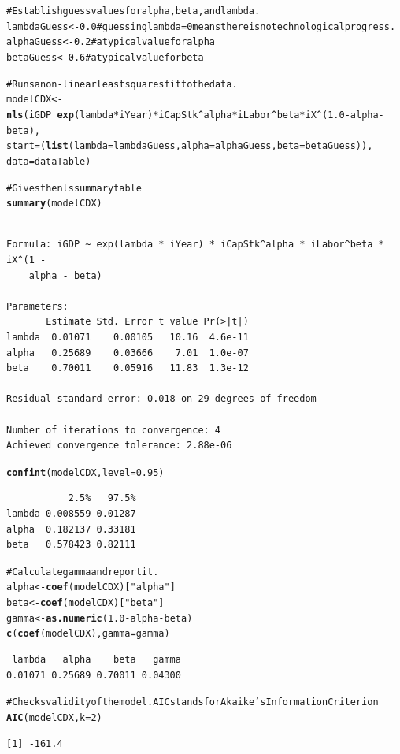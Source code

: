 \documentclass[preprint,authoryear,12pt]{elsarticle}\usepackage{graphicx, color}
\makeatletter
\newcommand{\hlfunctioncall}[1]{\textcolor[rgb]{0.501960784313725,0,0.329411764705882}{\textbf{#1}}}%
\newcommand{\hlstring}[1]{\textcolor[rgb]{0.6,0.6,1}{#1}}%
\newcommand{\hlcomment}[1]{\textcolor[rgb]{0.180392156862745,0.6,0.341176470588235}{#1}}%
\newenvironment{kframe}{%
 \def\at@end@of@kframe{}%
 \ifinner\ifhmode%
  \def\at@end@of@kframe{\end{minipage}}%
  \begin{minipage}{\columnwidth}%
 \fi\fi%
 \def\FrameCommand##1{\hskip\@totalleftmargin \hskip-\fboxsep
 \colorbox{shadecolor}{##1}\hskip-\fboxsep
     \hskip-\linewidth \hskip-\@totalleftmargin \hskip\columnwidth}%
 \MakeFramed {\advance\hsize-\width
   \@totalleftmargin\z@ \linewidth\hsize
   \@setminipage}}%
 {\par\unskip\endMakeFramed%
 \at@end@of@kframe}
\newenvironment{knitrout}{}{} %
\makeatother
\begin{document}
\begin{knitrout}
\color{fgcolor}\begin{kframe}
\begin{alltt}
\hlcomment{# Establish guess values for alpha, beta, and lambda.}
lambdaGuess <- 0.0 \hlcomment{# guessing lambda = 0 means there is no technological progress.}
alphaGuess <- 0.2 \hlcomment{# a typical value for alpha}
betaGuess <- 0.6 \hlcomment{# a typical value for beta}

\hlcomment{# Runs a non-linear least squares fit to the data.}
modelCDX <- \hlfunctioncall{nls}(iGDP ~ \hlfunctioncall{exp}(lambda*iYear) * iCapStk^alpha * iLabor^beta * iX^(1.0 - alpha - beta), 
                start=(\hlfunctioncall{list}(lambda=lambdaGuess,alpha=alphaGuess,beta=betaGuess)),
                data=dataTable)

\hlcomment{# Gives the nls summary table}
\hlfunctioncall{summary}(modelCDX)
\end{alltt}
\begin{verbatim}

Formula: iGDP ~ exp(lambda * iYear) * iCapStk^alpha * iLabor^beta * iX^(1 - 
    alpha - beta)

Parameters:
       Estimate Std. Error t value Pr(>|t|)
lambda  0.01071    0.00105   10.16  4.6e-11
alpha   0.25689    0.03666    7.01  1.0e-07
beta    0.70011    0.05916   11.83  1.3e-12

Residual standard error: 0.018 on 29 degrees of freedom

Number of iterations to convergence: 4 
Achieved convergence tolerance: 2.88e-06 
\end{verbatim}
\begin{alltt}
\hlfunctioncall{confint}(modelCDX, level = 0.95)
\end{alltt}


{\ttfamily\noindent\itshape\color{messagecolor}{Waiting for profiling to be done...}}\begin{verbatim}
           2.5%   97.5%
lambda 0.008559 0.01287
alpha  0.182137 0.33181
beta   0.578423 0.82111
\end{verbatim}
\begin{alltt}

\hlcomment{# Calculate gamma and report it.}
alpha <- \hlfunctioncall{coef}(modelCDX)[\hlstring{"alpha"}] 
beta <- \hlfunctioncall{coef}(modelCDX)[\hlstring{"beta"}] 
gamma <- \hlfunctioncall{as.numeric}(1.0 - alpha - beta)
\hlfunctioncall{c}(\hlfunctioncall{coef}(modelCDX),gamma=gamma)
\end{alltt}
\begin{verbatim}
 lambda   alpha    beta   gamma 
0.01071 0.25689 0.70011 0.04300 
\end{verbatim}
\begin{alltt}

\hlcomment{# Checks validity of the model. AIC stands for Akaike's Information Criterion}
\hlfunctioncall{AIC}(modelCDX, k=2)
\end{alltt}
\begin{verbatim}
[1] -161.4
\end{verbatim}
\end{kframe}
\end{knitrout}
\end{document}
